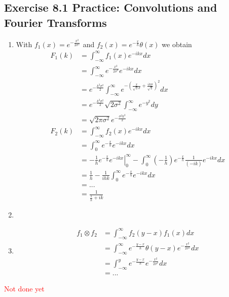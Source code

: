 \documentclass[10pt,a4paper]{book}
\theoremstyle{definition}
\begin{document}
\subsection{Exercise 8.1 Practice: Convolutions and Fourier Transforms}
\begin{enumerate}[label=(\alph*)]
\item With $f_1(x)=e^{-\frac{x^2}{2\sigma^2}}$ and $f_2(x)=e^{-\frac{x}{h}}\theta(x)$ we obtain
\begin{align}
    F_1(k)&=\int_{-\infty}^\infty f_1(x)e^{-ikx}dx\\
    &=\int_{-\infty}^\infty e^{-\frac{x^2}{2\sigma^2}}e^{-ikx}dx\\
    &=e^{-\frac{k^2\sigma^2}{2}}\int_{-\infty}^\infty e^{-\left(\frac{x}{\sqrt{2}\sigma}+\frac{ik\sigma}{\sqrt{2}}\right)^2}dx\\
    &=e^{-\frac{k^2\sigma^2}{2}} \sqrt{2\sigma^2} \int_{-\infty}^\infty e^{-y^2}dy\\
    &=\sqrt{2\pi\sigma^2}e^{-\frac{\sigma^2k^2}{2}}\\
    F_2(k)&=\int_{-\infty}^\infty f_2(x)e^{-ikx}dx\\
    &=\int_{0}^\infty e^{-\frac{x}{h}}e^{-ikx}dx\\
    &=-\frac{1}{h}\left.e^{-\frac{x}{h}}e^{-ikx}\right|_0^\infty -\int_{0}^\infty \left(-\frac{1}{h}\right)e^{-\frac{x}{h}}\frac{1}{(-ik)}e^{-ikx}dx\\
    &=\frac{1}{h} -\frac{1}{ihk}\int_{0}^\infty e^{-\frac{x}{h}}e^{-ikx}dx\\
    &= ...\\
    &=\frac{1}{\frac{1}{h}+ik}
\end{align}
\item
\item
\begin{align}
    f_1\otimes f_2
    &=\int_{-\infty}^\infty f_2(y-x)f_1(x)dx\\
    &=\int_{-\infty}^\infty e^{-\frac{y-x}{h}}\theta(y-x)e^{-\frac{x^2}{2\sigma^2}}dx\\
    &=\int_{-\infty}^y e^{-\frac{y-x}{h}}e^{-\frac{x^2}{2\sigma^2}}dx\\
    &=...
\end{align}
\end{enumerate}
\textcolor{red}{Not done yet}
\end{document}

